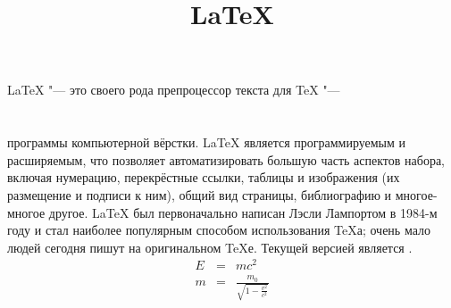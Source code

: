 \documentclass[12pt]{article}
\title{\LaTeX}
\date{}
\author{}
\begin{document}
  \maketitle
  \LaTeX{} "--- это своего рода препроцессор текста \TXXx{} для \TeX{} "---
\section{}
\section{}
  программы компьютерной вёрстки. \LaTeX{} является программируемым и
  расширяемым, что позволяет автоматизировать большую часть аспектов
  набора, включая нумерацию, перекрёстные ссылки, таблицы и изображения
  (их размещение и подписи к ним), общий вид страницы, библиографию и
  многое-многое другое. \LaTeX{} был первоначально написан Лэсли Лампортом
  в 1984-м году и стал наиболее популярным способом использования \TeX{}а;
  очень мало людей сегодня пишут на оригинальном \TeX{}е. Текущей
  версией является \LaTeXe.
  \newline
  \begin{eqnarray}
    E &=& mc^2\\
    m &=& \frac{m_0}{\sqrt{1-\frac{v^2}{c^2}}}
  \end{eqnarray}
\end{document}
